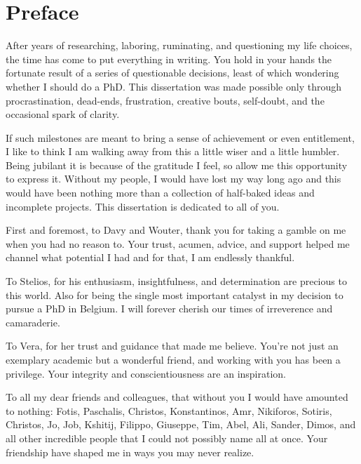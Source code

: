 \chapter*{Preface}
\label{ch:preface}

After years of researching, laboring, ruminating, and questioning my life choices, the time has come to put everything in writing.
You hold in your hands the fortunate result of a series of questionable decisions, least of which wondering whether I should do a PhD.
This dissertation was made possible only through procrastination, dead-ends, frustration, creative bouts, self-doubt, and the occasional spark of clarity.

If such milestones are meant to bring a sense of achievement or even entitlement, I like to think I am walking away from this a little wiser and a little humbler.
Being jubilant it is because of the gratitude I feel, so allow me this opportunity to express it.
Without my people, I would have lost my way long ago and this would have been nothing more than a collection of half-baked ideas and incomplete projects.
This dissertation is dedicated to all of you.

First and foremost, to Davy and Wouter, thank you for taking a gamble on me when you had no reason to. Your trust, acumen, advice, and support helped me channel what potential I had and for that, I am endlessly thankful.

To Stelios, for his enthusiasm, insightfulness, and determination are precious to this world. Also for being the single most important catalyst in my decision to pursue a PhD in Belgium. I will forever cherish our times of irreverence and camaraderie.

To Vera, for her trust and guidance that made me believe. You're not just an exemplary academic but a wonderful friend, and working with you has been a privilege. Your integrity and conscientiousness are an inspiration.

To all my dear friends and colleagues, that without you I would have amounted to nothing: Fotis, Paschalis, Christos, Konstantinos, Amr, Nikiforos, Sotiris, Christos, Jo, Job, Kshitij, Filippo, Giuseppe, Tim, Abel, Ali, Sander, Dimos, and all other incredible people that I could not possibly name all at once.
Your friendship have shaped me in ways you may never realize.

